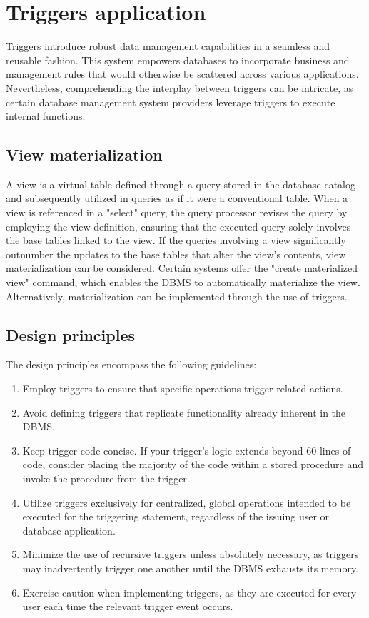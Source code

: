 \documentclass[12pt, a4paper]{report}
\begin{document}
    \section{Triggers application}
    Triggers introduce robust data management capabilities in a seamless and reusable fashion. 
    This system empowers databases to incorporate business and management rules that would otherwise be scattered across various applications. 
    Nevertheless, comprehending the interplay between triggers can be intricate, as certain database management system  providers leverage triggers to execute internal functions.

    \subsection{View materialization}
    A view is a virtual table defined through a query stored in the database catalog and subsequently utilized in queries as if it were a conventional table. 
    When a view is referenced in a "select" query, the query processor revises the query by employing the view definition, ensuring that the executed query solely involves the base tables linked to the view.   
    If the queries involving a view significantly outnumber the updates to the base tables that alter the view's contents, view materialization can be considered.  
    Certain systems offer the "create materialized view" command, which enables the DBMS to automatically materialize the view. 
    Alternatively, materialization can be implemented through the use of triggers.

    \subsection{Design principles}
    The design principles encompass the following guidelines:
    \begin{enumerate}
        \item Employ triggers to ensure that specific operations trigger related actions.
        \item Avoid defining triggers that replicate functionality already inherent in the DBMS. 
        \item Keep trigger code concise. 
            If your trigger's logic extends beyond 60 lines of code, consider placing the majority of the code within a stored procedure and invoke the procedure from the trigger.
        \item Utilize triggers exclusively for centralized, global operations intended to be executed for the triggering statement, regardless of the issuing user or database application.
        \item Minimize the use of recursive triggers unless absolutely necessary, as triggers may inadvertently trigger one another until the DBMS exhausts its memory.
        \item Exercise caution when implementing triggers, as they are executed for every user each time the relevant trigger event occurs.
    \end{enumerate}
\end{document}
